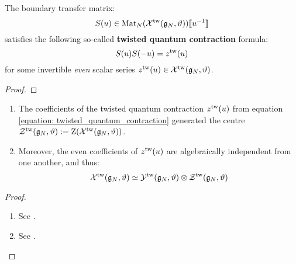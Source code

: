         \begin{lemma} \label{lemma: twisted_quantum_contractions}
            The boundary transfer matrix:
                $$S(u) \in \operatorname{Mat}_N( \mathcal{X}^{\mathrm{tw}}(\mathfrak{g}_N, \vartheta) )[\![u^{-1}]\!]$$
            satisfies the following so-called \textbf{twisted quantum contraction} formula:
                \begin{equation} \label{equation: twisted_quantum_contraction}
                    S(u) S(-u) = z^{\mathrm{tw}}(u)
                \end{equation}
            for some invertible \textit{even} scalar series $z^{\mathrm{tw}}(u) \in \mathcal{X}^{\mathrm{tw}}(\mathfrak{g}_N, \vartheta)$.
        \end{lemma}
            \begin{proof}
                
            \end{proof}
        \begin{lemma} \label{lemma: centres_of_extended_twisted_yangians}
            \begin{enumerate}
                \item The coefficients of the twisted quantum contraction $z^{\mathrm{tw}}(u)$ from equation \eqref{equation: twisted_quantum_contraction} generated the centre $\mathcal{Z}^{\mathrm{tw}}(\mathfrak{g}_N, \vartheta) := \mathrm{Z}( \mathcal{X}^{\mathrm{tw}}(\mathfrak{g}_N, \vartheta) )$.
                \item Moreover, the even coefficients of $z^{\mathrm{tw}}(u)$ are algebraically independent from one another, and thus:
                    $$\calX^{\tw}(\g_N, \vartheta) \cong \calY^{\tw}(\g_N, \vartheta) \tensor \calZ^{\tw}(\g_N, \vartheta)$$
            \end{enumerate}
        \end{lemma}
            \begin{proof}
                \begin{enumerate}
                    \item See \cite[Corollary 3.5]{guay_regelskis_twisted_yangians_for_symmetric_pairs_of_types_BCD}.
                    \item See \cite[Corollary 3.6]{guay_regelskis_twisted_yangians_for_symmetric_pairs_of_types_BCD}.
                \end{enumerate}
            \end{proof}